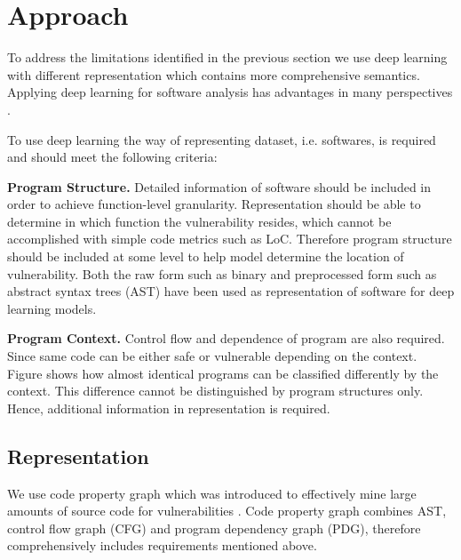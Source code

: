\section{Approach}

To address the limitations identified in the previous section we use deep learning with different representation which contains more comprehensive semantics.
Applying deep learning for software analysis has advantages in many perspectives \cite{shin2015recognizing}.

To use deep learning the way of representing dataset, i.e. softwares, is required and should meet the following criteria:


\textbf{Program Structure.} Detailed information of software should be included in order to achieve function-level granularity.
Representation should be able to determine in which function the vulnerability resides, which cannot be accomplished with simple code metrics such as LoC.
Therefore program structure should be included at some level to help model determine the location of vulnerability.
Both the raw form such as binary \cite{shin2015recognizing, kosmidis2017machine} and preprocessed form such as abstract syntax trees (AST) \cite{wang2016automatically}
have been used as representation of software for deep learning models.


\textbf{Program Context.} Control flow and dependence of program are also required. Since same code can be either safe or vulnerable depending on the context.
Figure shows how almost identical programs can be classified differently by the context.
This difference cannot be distinguished by program structures only. Hence, additional information in representation is required.


\subsection{Representation}
We use code property graph which was introduced to effectively mine large amounts of source code for vulnerabilities \cite{yamaguchi2014modeling}.
Code property graph combines AST, control flow graph (CFG) and program dependency graph (PDG), therefore comprehensively includes requirements mentioned above.

